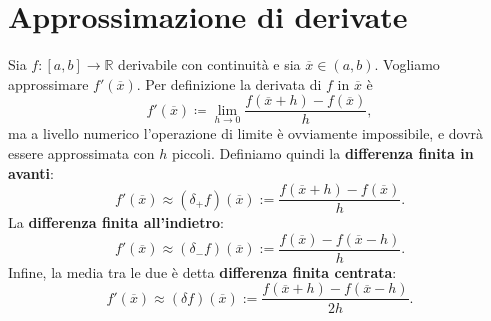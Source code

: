 \section{Approssimazione di derivate}
Sia $f:[ a,b]\rightarrow \mathbb{R}$ derivabile con continuità e sia $\overline{x} \in ( a,b)$. Vogliamo approssimare $f'(\overline{x})$. Per definizione la derivata di $f$ in $\overline{x}$ è
\begin{equation*}
f'(\overline{x}) \coloneqq \lim _{h\rightarrow 0}\frac{f(\overline{x} +h) -f(\overline{x})}{h} ,
\end{equation*}
ma a livello numerico l'operazione di limite è ovviamente impossibile, e dovrà essere approssimata con $h$ piccoli.
Definiamo quindi la \textbf{differenza finita in avanti}:
\begin{equation}
f'(\overline{x}) \approx ( \delta _{+} f)(\overline{x}) :=\frac{f(\overline{x} +h) -f(\overline{x})}{h}.
\label{eq:diff-fin-avanti}
\end{equation}
La \textbf{differenza finita all'indietro}:
\begin{equation}
f'(\overline{x}) \approx ( \delta _{-} f)(\overline{x}) :=\frac{f(\overline{x}) -f(\overline{x} -h)}{h}.
\label{eq:diff-fin-indietro}
\end{equation}
Infine, la media tra le due è detta \textbf{differenza finita centrata}:
\begin{equation}
f'(\overline{x}) \approx ( \delta f)(\overline{x}) :=\frac{f(\overline{x} +h) -f(\overline{x} -h)}{2h}.
\label{eq:diff-fin-centrata}
\end{equation}

